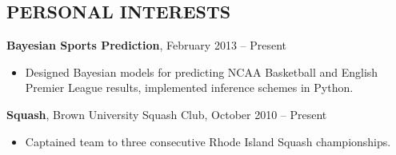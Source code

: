 \documentclass[margin]{res}
\begin{document}
\begin{resume}
\section{PERSONAL INTERESTS} 	{\bf Bayesian Sports Prediction}, February 2013 -- Present 
				\begin{itemize} \itemsep -2pt
                                  \item Designed Bayesian models for predicting NCAA Basketball and English Premier League results, implemented inference schemes in Python.  
                                \end{itemize}
                                {\bf Squash}, Brown University Squash Club, October 2010 -- Present 
				\begin{itemize}\itemsep -2pt
                                  \item Captained team to three consecutive Rhode Island Squash championships.
				\end{itemize}
                                

\end{resume}
\end{document}
